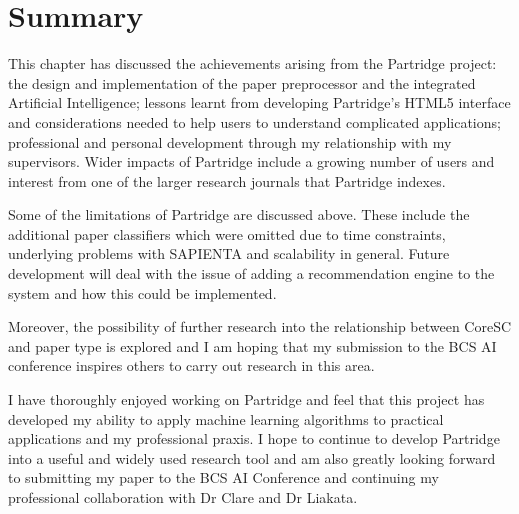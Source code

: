 \section{ Summary }

This chapter has discussed the achievements arising from the Partridge project:
the design and implementation of the paper preprocessor and the integrated
Artificial Intelligence; lessons learnt from developing Partridge's HTML5
interface and considerations needed to help users to understand complicated
applications; professional and personal development through my relationship
with my supervisors. Wider impacts of Partridge include a growing number of
users and interest from one of the larger research journals that Partridge
indexes.

Some of the limitations of Partridge are discussed above. These include the
additional paper classifiers which were omitted due to time constraints,
underlying problems with SAPIENTA and scalability in general. Future
development will deal with the issue of adding a recommendation engine to the
system and how this could be implemented.

Moreover, the possibility of further research into the relationship between
CoreSC and paper type is explored and I am hoping that my submission to the BCS
AI conference inspires others to carry out research in this area. 

I have thoroughly enjoyed working on Partridge and feel that this project has
developed my ability to apply machine learning algorithms to practical
applications and my professional praxis. I hope to continue to develop
Partridge into a useful and widely used research tool and am also
greatly looking forward to submitting my paper to the BCS AI Conference and
continuing my professional collaboration with Dr Clare and Dr Liakata. 
